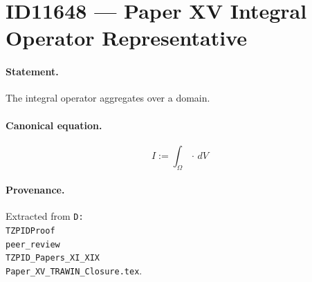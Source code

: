 \section*{ID11648 --- Paper XV Integral Operator Representative}

\paragraph{Statement.}
The integral operator aggregates over a domain.

\paragraph{Canonical equation.}
\[
I:=\int_\Omega \cdot\,dV
\]

\paragraph{Provenance.}
Extracted from \texttt{D:\\TZPIDProof\\peer\_review\\TZPID\_Papers\_XI\_XIX\\Paper\_XV\_TRAWIN\_Closure.tex}.
